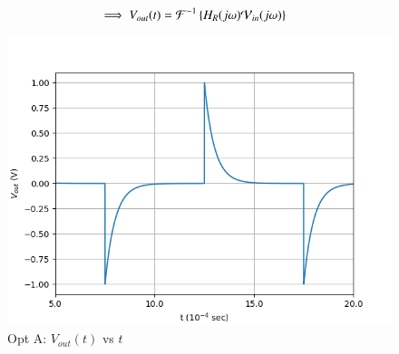 \documentclass[journal,12pt,twocolumn]{IEEEtran}
\theoremstyle{remark}
\begin{document}
\begin{enumerate}
\begin{align}
        \implies V_{out}(t) &= \mathcal{F}^{-1}\left\{H_R(j\omega)\mathcal{V}_{in}(j\omega)\right\}
    \end{align}
    \begin{figure}[!h]
        \centering
        \includegraphics[width = \columnwidth]{figs/opt_a_res.png}
        \caption{Opt A: $V_{out}(t)$ vs $t$}
        \label{fig:opt_a_res_gate.23.ph.37}
    \end{figure}


\end{enumerate}
\end{document}
